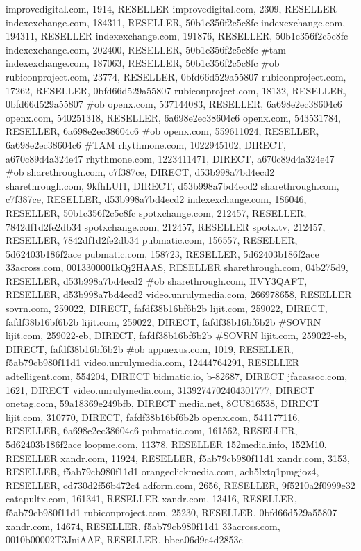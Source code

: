 improvedigital.com, 1914, RESELLER
improvedigital.com, 2309, RESELLER
indexexchange.com, 184311, RESELLER, 50b1c356f2c5c8fc
indexexchange.com, 194311, RESELLER
indexexchange.com, 191876, RESELLER, 50b1c356f2c5c8fc
indexexchange.com, 202400, RESELLER, 50b1c356f2c5c8fc #tam
indexexchange.com, 187063, RESELLER, 50b1c356f2c5c8fc #ob
rubiconproject.com, 23774, RESELLER, 0bfd66d529a55807
rubiconproject.com, 17262, RESELLER, 0bfd66d529a55807
rubiconproject.com, 18132, RESELLER, 0bfd66d529a55807 #ob
openx.com, 537144083, RESELLER, 6a698e2ec38604c6
openx.com, 540251318, RESELLER, 6a698e2ec38604c6
openx.com, 543531784, RESELLER, 6a698e2ec38604c6 #ob
openx.com, 559611024, RESELLER, 6a698e2ec38604c6 #TAM
rhythmone.com, 1022945102, DIRECT, a670c89d4a324e47
rhythmone.com, 1223411471, DIRECT, a670c89d4a324e47 #ob
sharethrough.com, c7f387ce, DIRECT, d53b998a7bd4ecd2
sharethrough.com, 9kfhLUI1, DIRECT, d53b998a7bd4ecd2
sharethrough.com, c7f387ce, RESELLER, d53b998a7bd4ecd2
indexexchange.com, 186046, RESELLER, 50b1c356f2c5c8fc
spotxchange.com, 212457, RESELLER, 7842df1d2fe2db34
spotxchange.com, 212457, RESELLER
spotx.tv, 212457, RESELLER, 7842df1d2fe2db34
pubmatic.com, 156557, RESELLER, 5d62403b186f2ace
pubmatic.com, 158723, RESELLER, 5d62403b186f2ace
33across.com, 0013300001kQj2HAAS, RESELLER
sharethrough.com, 04b275d9, RESELLER, d53b998a7bd4ecd2 #ob
sharethrough.com, HVY3QAFT, RESELLER, d53b998a7bd4ecd2
video.unrulymedia.com, 266978658, RESELLER
sovrn.com, 259022, DIRECT, fafdf38b16bf6b2b
lijit.com, 259022, DIRECT, fafdf38b16bf6b2b
lijit.com, 259022, DIRECT, fafdf38b16bf6b2b #SOVRN
lijit.com, 259022-eb, DIRECT, fafdf38b16bf6b2b #SOVRN
lijit.com, 259022-eb, DIRECT, fafdf38b16bf6b2b #ob
appnexus.com, 1019, RESELLER, f5ab79cb980f11d1
video.unrulymedia.com, 12444764291, RESELLER
adtelligent.com, 554204, DIRECT
bidmatic.io, b-82687, DIRECT
jfacassoc.com, 1621, DIRECT
video.unrulymedia.com, 3139274702404301777, DIRECT
onetag.com, 59a18369e249bfb, DIRECT
media.net, 8CU816538, DIRECT
lijit.com, 310770, DIRECT, fafdf38b16bf6b2b
openx.com, 541177116, RESELLER, 6a698e2ec38604c6
pubmatic.com, 161562, RESELLER, 5d62403b186f2ace
loopme.com, 11378, RESELLER
152media.info, 152M10, RESELLER
xandr.com, 11924, RESELLER, f5ab79cb980f11d1
xandr.com, 3153, RESELLER, f5ab79cb980f11d1
orangeclickmedia.com, ach5lxtq1pmgjoz4, RESELLER, cd730d2f56b472c4
adform.com, 2656, RESELLER, 9f5210a2f0999e32
catapultx.com, 161341, RESELLER
xandr.com, 13416, RESELLER, f5ab79cb980f11d1
rubiconproject.com, 25230, RESELLER, 0bfd66d529a55807
xandr.com, 14674, RESELLER, f5ab79cb980f11d1
33across.com, 0010b00002T3JniAAF, RESELLER, bbea06d9c4d2853c
